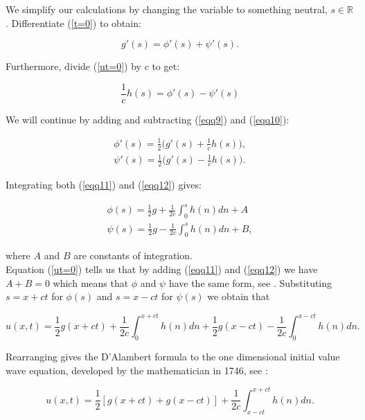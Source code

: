 \documentclass[a4paper, 12pt]{article}
\numberwithin{equation}{section}
\begin{document}
We simplify our calculations by changing the variable to something neutral, $s \in \mathbb{R}$. 
Differentiate (\ref{t=0}) to obtain:

\begin{equation} \label{eqq9}
    g'(s)=\phi'(s)+\psi'(s).
\end{equation}

Furthermore, divide (\ref{ut=0}) by $c$ to get:

\begin{equation} \label{eqq10}
    \frac{1}{c}h(s)=\phi'(s)-\psi'(s)
\end{equation}

We will continue by adding and subtracting (\ref{eqq9}) and (\ref{eqq10}):

\begin{align} \label{eqq11}
    \phi'(s)=\frac{1}{2}\Big(g'(s)+\frac{1}{c}h(s)\Big),\\
    \label{eqq12}
    \psi'(s)=\frac{1}{2}\Big(g'(s)-\frac{1}{c}h(s)\Big).
\end{align}

Integrating both (\ref{eqq11}) and (\ref{eqq12}) gives:

\begin{equation}
    \begin{aligned}
    \phi(s)=\frac{1}{2}g+\frac{1}{2c}\int^s_0h(n)dn+A\\
    \psi(s)=\frac{1}{2}g-\frac{1}{2c}\int^s_0h(n)dn+B,
    \end{aligned}
\end{equation}

where $A$ and $B$ are constants of integration.
\\

Equation (\ref{ut=0}) tells us that by adding (\ref{eqq11}) and (\ref{eqq12}) we have $A+B=0$ which means that $\phi$ and $\psi$ have the
same form, see \cite{Str}. Substituting $s=x+ct$ for $\phi(s)$ and $s=x-ct$ for $\psi(s)$ we obtain that

\begin{equation}
    u(x,t)=\frac{1}{2}g(x+ct)+\frac{1}{2c}\int^{x+ct}_0h(n)dn+\frac{1}{2}g(x-ct)-\frac{1}{2c}\int^{x-ct}_0h(n)dn.
\end{equation}

Rearranging gives the D'Alambert formula to the one dimensional initial value wave equation, developed by the mathematician in 1746, see \cite{Str}:

\begin{equation} \label{DAla}
    u(x,t)=\frac{1}{2}\left[g(x+ct)+g(x-ct)\right]+\frac{1}{2c}\int^{x+ct}_{x-ct}h(n)dn.
\end{equation}
\end{document}
